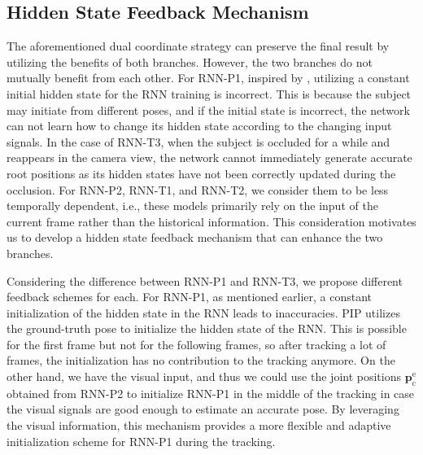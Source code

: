 \subsection{Hidden State Feedback Mechanism}\label{sec:feedback}
The aforementioned dual coordinate strategy can preserve the final result by utilizing the benefits of both branches.
%
However, the two branches do not mutually benefit from each other.
%
For RNN-P1, inspired by \cite{PIP},  utilizing a constant initial hidden state for the RNN training is incorrect.
%
This is because the subject may initiate from different poses, and if the initial state is incorrect, the network can not learn how to change its hidden state according to the changing input signals.
%
%
In the case of RNN-T3, when the subject is occluded for a while and reappears in the camera view, the network cannot immediately generate accurate root positions as its hidden states have not been correctly updated during the occlusion.
%
For RNN-P2, RNN-T1, and RNN-T2, we consider them to be less temporally dependent, i.e., these models primarily rely on the input of the current frame rather than the historical information.
%
This consideration motivates us to develop a hidden state feedback mechanism that can enhance the two branches.
%
\par
Considering the difference between RNN-P1 and RNN-T3, we propose different feedback schemes for each.
%
For RNN-P1, as mentioned earlier, a constant initialization of the hidden state in the RNN leads to inaccuracies.
%
PIP utilizes the ground-truth pose to initialize the hidden state of the RNN.
%
This is possible for the first frame but not for the following frames, so after tracking a lot of frames, the initialization has no contribution to the tracking anymore.
%
%
On the other hand, we have the visual input, and thus we could use the joint positions $\boldsymbol{p}_{\mathrm{c}}^{\mathrm{e}}$ obtained from RNN-P2 to initialize RNN-P1 in the middle of the tracking in case the visual signals are good enough to estimate an accurate pose.
%
%
By leveraging the visual information, this mechanism provides a more flexible and adaptive initialization scheme for RNN-P1 during the tracking.

